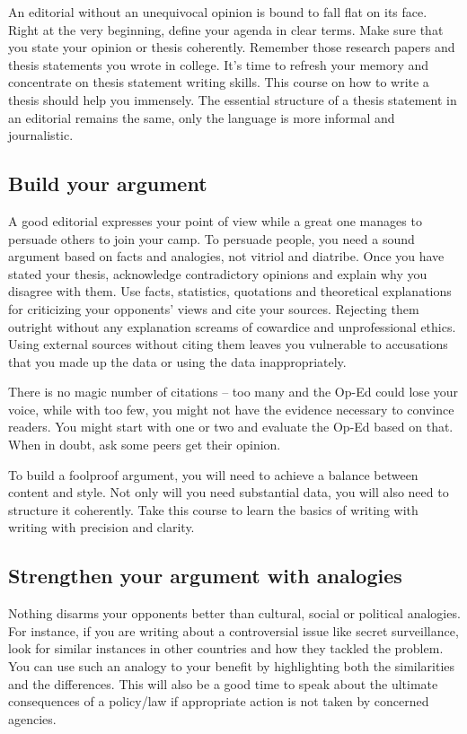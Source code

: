 \documentclass{tufte-handout}\usepackage[]{graphicx}\usepackage[]{color}
\begin{document}
An editorial without an unequivocal opinion is bound to fall flat on its face. Right at the very beginning, define your agenda in clear terms. Make sure that you state your opinion or thesis coherently. Remember those research papers and thesis statements you wrote in college. It's time to refresh your memory and concentrate on thesis statement writing skills. This course on how to write a thesis should help you immensely. The essential structure of a thesis statement in an editorial remains the same, only the language is more informal and journalistic.

\subsection{Build your argument}

A good editorial expresses your point of view while a great one manages to persuade others to join your camp. To persuade people, you need a sound argument based on facts and analogies, not vitriol and diatribe. Once you have stated your thesis, acknowledge contradictory opinions and explain why you disagree with them. Use facts, statistics, quotations and theoretical explanations for criticizing your opponents' views and cite your sources. Rejecting them outright without any explanation screams of cowardice and unprofessional ethics. Using external sources without citing them leaves you vulnerable to accusations that you made up the data or using the data inappropriately. 

There is no magic number of citations -- too many and the Op-Ed could lose your voice, while with too few, you might not have the evidence necessary to convince readers. You might start with one or two and evaluate the Op-Ed based on that. When in doubt, ask some peers get their opinion. 

To build a foolproof argument, you will need to achieve a balance between content and style. Not only will you need substantial data, you will also need to structure it coherently. Take this course to learn the basics of writing with writing with precision and clarity.

\subsection{Strengthen your argument with analogies}

Nothing disarms your opponents better than cultural, social or political analogies. For instance, if you are writing about a controversial issue like secret surveillance, look for similar instances in other countries and how they tackled the problem. You can use such an analogy to your benefit by highlighting both the similarities and the differences. This will also be a good time to speak about the ultimate consequences of a policy/law if appropriate action is not taken by concerned agencies.
\end{document}
